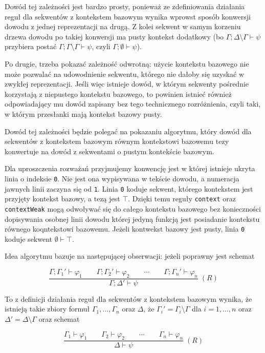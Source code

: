 \documentclass[shortabstract]{iithesis}
\theoremstyle{definition}
\theoremstyle{remark}
\theoremstyle{plain}
\begin{document}
Dowód tej zależności jest bardzo prosty, ponieważ ze zdefiniowania działania reguł dla sekwentów z kontekstem bazowym
wynika wprowst sposób konwersji dowodu z jednej reprezentacji na drugą. Z kolei sekwent w samym korzeniu drzewa dowodu po takiej konwersji ma 
pusty kontekst dodatkowy (bo \(\Gamma ; \Delta \setminus \Gamma \vdash \psi\) przybiera postać \(\Gamma ; \Gamma \setminus \Gamma \vdash \psi\), czyli \(\Gamma ; \emptyset \vdash \psi\)). 

Po drugie, trzeba pokazać zależność odwrotną: użycie kontekstu bazowego nie może
pozwalać na udowodnienie sekwentu, którego nie dałoby się uzyskać w zwykłej
reprezentacji. Jeśli więc istnieje dowód, w którym sekwenty pośrednie korzystają
z niepustego kontekstu bazowego, to powinien istnieć również odpowiadający mu
dowód zapisany bez tego technicznego rozróżnienia, czyli taki, w którym przesłanki mają kontekst bazowy pusty.

Dowód tej zależności będzie polegać na pokazaniu algorytmu, który dowód dla sekwentów z kontekstem bazowym równym kontekstowi bazowemu tezy 
konwertuje na dowód z sekwentami o pustym kontekście bazowym.

Dla uproszczenia rozważań przyjmujemy konwencję jest w której istnieje ukryta linia o indeksie \texttt{0}. Nie jest ona
wypisywana w tekście dowodu, a numeracja jawnych linii zaczyna się od \texttt{1}.
Linia \texttt{0} koduje sekwent, którego kontekstem jest przyjęty kontekst bazowy,
a tezą jest \(\top\). Dzięki temu reguły \texttt{context} oraz \texttt{contextWeak}
mogą odwoływać się do całego kontekstu bazowego bez konieczności dopisywania
osobnej linii dowodu której jedyną funkcją jest posiadanie kontekstu równego koqntekstowi bazowemu. 
Jeżeli kontwekst bazowy jest pusty, linia \texttt{0} koduje sekwent \(\emptyset \vdash \top\).

Idea algorytmu bazuje na następującej obserwacji: jeżeli poprawny jest schemat 


\[
\frac{
    \Gamma ; \Gamma_1 ' \vdash \varphi_1
    \qquad
    \Gamma ; \Gamma_2 '\vdash \varphi_2
    \qquad
    \cdots
    \qquad
    \Gamma ; \Gamma_n ' \vdash \varphi_n
}{
    \Gamma ; \Delta ' \vdash \psi
}\;(R)
\]

To z definicji działania reguł dla sekwentów z kontekstem bazowym wynika, że istnieją takie zbiory formuł \(\Gamma_1,\ldots,\Gamma_n\) oraz \(\Delta\), że 
\(\Gamma_i ' = \Gamma_i \setminus \Gamma\) dla \(i=1,\ldots,n\) oraz \(\Delta ' = \Delta \setminus \Gamma\) oraz schemat


\[
\frac{
    \Gamma_1  \vdash \varphi_1
    \qquad
    \Gamma_2  \vdash \varphi_2
    \qquad
    \cdots
    \qquad
     \Gamma_n  \vdash \varphi_n
}{
    \Delta \vdash \psi
}\;(R)
\]
\end{document}
